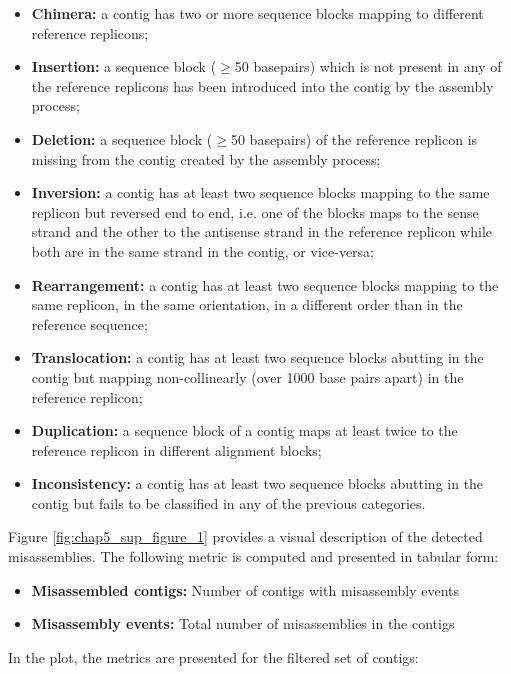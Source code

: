 \begin{itemize}
    \item \textbf{Chimera:} a contig has two or more sequence blocks mapping to different reference replicons;
    \item \textbf{Insertion:} a sequence block ($\geq $50 basepairs) which is not present in any of the reference replicons has been introduced into the contig by the assembly process;
    \item \textbf{Deletion:} a sequence block ($\geq $50 basepairs) of the reference replicon is missing from the contig created by the assembly process;
    \item \textbf{Inversion:} a contig has at least two sequence blocks mapping to the same replicon but reversed end to end, i.e. one of the blocks maps to the sense strand and the other to the antisense strand in the reference replicon while both are in the same strand in the contig, or vice-versa;
    \item \textbf{Rearrangement:} a contig has at least two sequence blocks mapping to the same replicon, in the same orientation, in a different order than in the reference sequence;
    \item \textbf{Translocation:} a contig has at least two sequence blocks abutting in the contig but mapping non-collinearly (over 1000 base pairs apart) in the reference replicon;
    \item \textbf{Duplication:} a sequence block of a contig maps at least twice to the reference replicon in different alignment blocks;
    \item \textbf{Inconsistency:} a contig has at least two sequence blocks abutting in the contig but fails to be classified in any of the previous categories.
\end{itemize}

Figure \ref{fig:chap5_sup_figure_1} provides a visual description of the detected misassemblies. The following metric is computed and presented in tabular form:

\begin{itemize}
    \item \textbf{Misassembled contigs:} Number of contigs with misassembly events
    \item \textbf{Misassembly events:} Total number of misassemblies in the contigs
\end{itemize}

In the plot, the metrics are presented for the filtered set of contigs:

